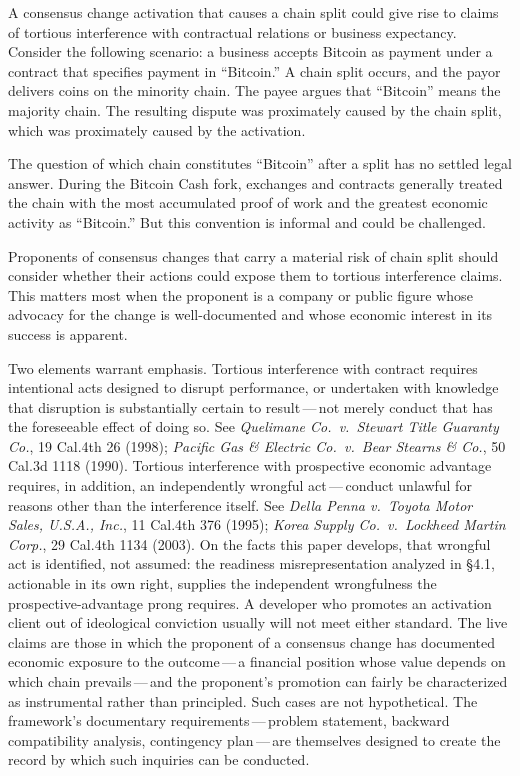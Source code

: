 \documentclass[11pt, twoside, openright]{book}
\newcommand{\sect}[1]{\S#1}
\begin{document}
A consensus change activation that causes a chain split could give rise to claims of tortious interference with contractual relations or business expectancy. Consider the following scenario: a business accepts Bitcoin as payment under a contract that specifies payment in ``Bitcoin.'' A chain split occurs, and the payor delivers coins on the minority chain. The payee argues that ``Bitcoin'' means the majority chain. The resulting dispute was proximately caused by the chain split, which was proximately caused by the activation.

The question of which chain constitutes ``Bitcoin'' after a split has no settled legal answer. During the Bitcoin Cash fork, exchanges and contracts generally treated the chain with the most accumulated proof of work and the greatest economic activity as ``Bitcoin.'' But this convention is informal and could be challenged.

Proponents of consensus changes that carry a material risk of chain split should consider whether their actions could expose them to tortious interference claims. This matters most when the proponent is a company or public figure whose advocacy for the change is well-documented and whose economic interest in its success is apparent.

Two elements warrant emphasis. Tortious interference with contract requires intentional acts designed to disrupt performance, or undertaken with knowledge that disruption is substantially certain to result\,---\,not merely conduct that has the foreseeable effect of doing so. See \textit{Quelimane Co.~v.~Stewart Title Guaranty Co.}, 19 Cal.4th 26 (1998); \textit{Pacific Gas \& Electric Co.~v.~Bear Stearns \& Co.}, 50 Cal.3d 1118 (1990). Tortious interference with prospective economic advantage requires, in addition, an independently wrongful act\,---\,conduct unlawful for reasons other than the interference itself. See \textit{Della Penna v.~Toyota Motor Sales, U.S.A., Inc.}, 11 Cal.4th 376 (1995); \textit{Korea Supply Co.~v.~Lockheed Martin Corp.}, 29 Cal.4th 1134 (2003). On the facts this paper develops, that wrongful act is identified, not assumed: the readiness misrepresentation analyzed in \sect{4.1}, actionable in its own right, supplies the independent wrongfulness the prospective-advantage prong requires. A developer who promotes an activation client out of ideological conviction usually will not meet either standard. The live claims are those in which the proponent of a consensus change has documented economic exposure to the outcome\,---\,a financial position whose value depends on which chain prevails\,---\,and the proponent's promotion can fairly be characterized as instrumental rather than principled. Such cases are not hypothetical. The framework's documentary requirements\,---\,problem statement, backward compatibility analysis, contingency plan\,---\,are themselves designed to create the record by which such inquiries can be conducted.
\end{document}
